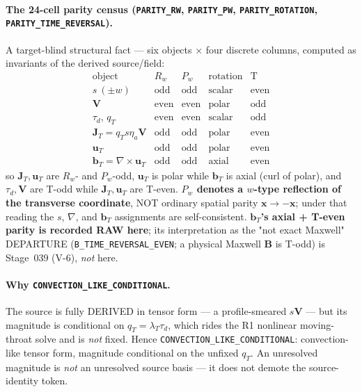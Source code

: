 \paragraph{The 24-cell parity census (\texttt{PARITY\_RW}, \texttt{PARITY\_PW}, \texttt{PARITY\_ROTATION}, \texttt{PARITY\_TIME\_REVERSAL}).}
A target-blind structural fact --- six objects \(\times\) four discrete columns,
computed as invariants of the derived source/field:
\[
  \begin{array}{l|cccc}
    \text{object} & R_w & P_w & \text{rotation} & \text{T}\\\hline
    s\ (\pm w) & \text{odd} & \text{odd} & \text{scalar} & \text{even}\\
    \mathbf V & \text{even} & \text{even} & \text{polar} & \text{odd}\\
    \tau_d,\,q_T & \text{even} & \text{even} & \text{scalar} & \text{odd}\\
    \mathbf J_T=q_T s\eta_a\mathbf V & \text{odd} & \text{odd} & \text{polar} & \text{even}\\
    \mathbf u_T & \text{odd} & \text{odd} & \text{polar} & \text{even}\\
    \mathbf b_T=\nabla\!\times\!\mathbf u_T & \text{odd} & \text{odd} & \text{axial} & \text{even}
  \end{array}
\]
so \(\mathbf J_T,\mathbf u_T\) are \(R_w\)- and \(P_w\)-odd, \(\mathbf u_T\) is
polar while \(\mathbf b_T\) is axial (curl of polar), and \(\tau_d,\mathbf V\) are
T-odd while \(\mathbf J_T,\mathbf u_T\) are T-even. \textbf{\(P_w\) denotes a
\(w\)-type reflection of the transverse coordinate}, NOT ordinary spatial parity
\(\mathbf x\to-\mathbf x\); under that reading the \(s\), \(\nabla\), and
\(\mathbf b_T\) assignments are self-consistent. \textbf{\(\mathbf b_T\)'s axial +
T-even parity is recorded RAW here}; its interpretation as the "not exact Maxwell"
DEPARTURE (\texttt{B\_TIME\_REVERSAL\_EVEN}; a physical Maxwell \(\mathbf B\) is
T-odd) is Stage~039 (V-6), \emph{not} here.

\paragraph{Why \texttt{CONVECTION\_LIKE\_CONDITIONAL}.}
The source is fully DERIVED in tensor form --- a profile-smeared \(s\mathbf V\) ---
but its magnitude is conditional on \(q_T=\lambda_T\tau_d\), which rides the R1
nonlinear moving-throat solve and is \emph{not} fixed. Hence
\texttt{CONVECTION\_LIKE\_CONDITIONAL}: convection-like tensor form, magnitude
conditional on the unfixed \(q_T\). An unresolved magnitude is \emph{not} an
unresolved source basis --- it does not demote the source-identity token.

